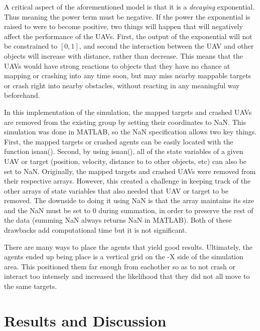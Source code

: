\documentclass[a4paper,12pt]{report}
\begin{document}
A critical aspect of the aforementioned model is that it is a \textit{decaying} exponential. Thus meaning the power term must be negative. If the power the exponential is raised to were to become positive, two things will happen that will negatively affect the performance of the UAVs. First, the output of the exponential will not be constrained to $[0, 1]$, and second the interaction between the UAV and other objects will increase with distance, rather than decrease. This means that the UAVs would have strong reactions to objects that they have no chance at mapping or crashing into any time soon, but may miss nearby mappable targets or crash right into nearby obstacles, without reacting in any meaningful way beforehand.

In this implementation of the simulation, the mapped targets and crashed UAVs are removed from the existing group by setting their coordinates to NaN. This simulation was done in MATLAB, so the NaN specification allows two key things. First, the mapped targets or crashed agents can be easily located with the function isnan(). Second, by using isnan(), all of the state variables of a given UAV or target (position, velocity, distance to to other objects, etc) can also be set to NaN. Originally, the mapped targets and crashed UAVs were removed from their respective arrays. However, this created a challenge in keeping track of the other arrays of state variables that also needed that UAV or target to be removed. The downside to doing it using NaN is that the array maintains its size and the NaN must be set to 0 during summation, in order to preserve the rest of the data (summing NaN always returns NaN in MATLAB). Both of these drawbacks add computational time but it is not significant.

There are many ways to place the agents that yield good results. Ultimately, the agents ended up being place is a vertical grid on the -X side of the simulation area. This positioned them far enough from eachother so as to not crash or interact too intensely and increased the likelihood that they did not all move to the same targets.

\section{Results and Discussion}
\end{document}
